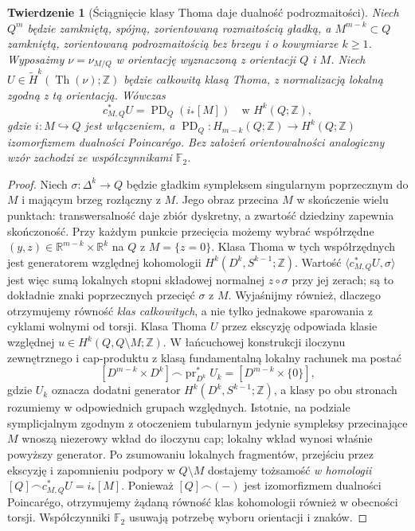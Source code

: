 \documentclass[11pt,a4paper,oneside]{report}
\newcommand{\F}{\mathbb{F}}
\newcommand{\R}{\mathbb{R}}
\newcommand{\Z}{\mathbb{Z}}
\theoremstyle{plain}
\newtheorem{twierdzenie}{Twierdzenie}[section]
\theoremstyle{definition}
\theoremstyle{remark}
\begin{document}
\begin{twierdzenie}[Ściągnięcie klasy Thoma daje dualność podrozmaitości]
\label{thm:pt-pd-v9}
Niech $Q^m$ będzie zamkniętą, spójną, zorientowaną
rozmaitością gładką, a $M^{m-k}\subset Q$ zamkniętą,
zorientowaną podrozmaitością bez brzegu i o kowymiarze
$k\ge1$. Wyposażmy $\nu=\nu_{M/Q}$ w orientację
wyznaczoną z orientacji $Q$ i $M$.
Niech $U\in\widetilde H^k(\operatorname{Th}(\nu);\Z)$
będzie całkowitą klasą Thoma, z normalizacją lokalną
zgodną z tą orientacją. Wówczas
\[
c_{M,Q}^*U=\operatorname{PD}_Q(i_*[M])
\quad\text{w }H^k(Q;\Z),
\]
gdzie $i:M\hookrightarrow Q$ jest włączeniem, a
$\operatorname{PD}_Q:H_{m-k}(Q;\Z)\to H^k(Q;\Z)$
izomorfizmem dualności Poincarégo.
Bez założeń orientowalności analogiczny wzór zachodzi
ze współczynnikami $\F_2$.
\end{twierdzenie}
\begin{proof}
Niech $\sigma:\Delta^k\to Q$ będzie gładkim
sympleksem singularnym poprzecznym do $M$ i mającym
brzeg rozłączny z $M$. Jego obraz przecina $M$ w
skończenie wielu punktach: transwersalność daje
zbiór dyskretny, a zwartość dziedziny zapewnia
skończoność. Przy każdym punkcie przecięcia możemy
wybrać współrzędne $(y,z)\in\R^{m-k}\times\R^k$
na $Q$ z $M=\{z=0\}$. Klasa Thoma w tych
współrzędnych jest generatorem względnej kohomologii
$H^k(D^k,S^{k-1};\Z)$. Wartość
$\langle c_{M,Q}^*U,\sigma\rangle$ jest więc
sumą lokalnych stopni składowej normalnej
$z\circ\sigma$ przy jej zerach; są to dokładnie
znaki poprzecznych przecięć $\sigma$ z $M$.
Wyjaśnijmy również, dlaczego otrzymujemy równość
\emph{klas całkowitych}, a nie tylko jednakowe
sparowania z cyklami wolnymi od torsji. Klasa Thoma $U$
przez ekscyzję odpowiada klasie względnej
$u\in H^k(Q,Q\setminus M;\Z)$. W łańcuchowej
konstrukcji iloczynu zewnętrznego i cap-produktu
z klasą fundamentalną lokalny rachunek ma postać
\[
[D^{m-k}\times D^k]\frown
\operatorname{pr}_{D^k}^*U_k
=[D^{m-k}\times\{0\}],
\]
gdzie $U_k$ oznacza dodatni generator
$H^k(D^k,S^{k-1};\Z)$, a klasy po obu stronach
rozumiemy w odpowiednich grupach względnych.
Istotnie, na podziale symplicjalnym zgodnym z
otoczeniem tubularnym jedynie sympleksy przecinające
$M$ wnoszą niezerowy wkład do iloczynu cap;
lokalny wkład wynosi właśnie powyższy generator.
Po zsumowaniu lokalnych fragmentów, przejściu przez
ekscyzję i zapomnieniu podpory w $Q\setminus M$
dostajemy tożsamość \emph{w homologii}
$[Q]\frown c_{M,Q}^*U=i_*[M]$.
Ponieważ $[Q]\frown(-)$ jest izomorfizmem dualności
Poincarégo, otrzymujemy żądaną równość klas
kohomologii również w obecności torsji. Współczynniki
$\F_2$ usuwają potrzebę wyboru orientacji i znaków.
\end{proof}
\end{document}
